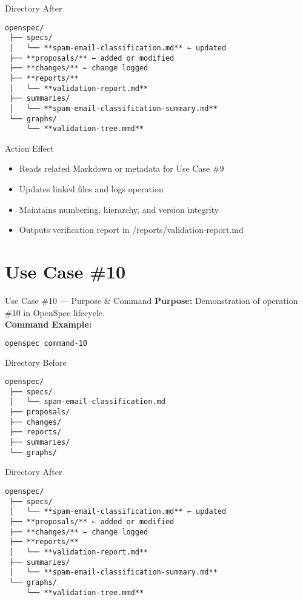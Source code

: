 \documentclass[aspectratio=169]{beamer}
\begin{document}
\begin{frame}{Directory After}
\begin{lstlisting}
openspec/
 ├── specs/
 │   └── **spam-email-classification.md** ← updated
 ├── **proposals/** ← added or modified
 ├── **changes/** ← change logged
 ├── **reports/**
 │   └── **validation-report.md**
 ├── summaries/
 │   └── **spam-email-classification-summary.md**
 └── graphs/
     └── **validation-tree.mmd**
\end{lstlisting}
\end{frame}

\begin{frame}{Action Effect}
\begin{itemize}
  \item Reads related Markdown or metadata for Use Case \#9
  \item Updates linked files and logs operation
  \item Maintains numbering, hierarchy, and version integrity
  \item Outputs verification report in /reports/validation-report.md
\end{itemize}
\end{frame}

\section*{Use Case \#10}
\begin{frame}{Use Case \#10 --- Purpose \& Command}
\textbf{Purpose:} Demonstration of operation \#10 in OpenSpec lifecycle.\\[4pt]
\textbf{Command Example:}
\begin{lstlisting}[language=bash]
openspec command-10
\end{lstlisting}
\end{frame}

\begin{frame}{Directory Before}
\begin{lstlisting}
openspec/
 ├── specs/
 │   └── spam-email-classification.md
 ├── proposals/
 ├── changes/
 ├── reports/
 ├── summaries/
 └── graphs/
\end{lstlisting}
\end{frame}

\begin{frame}{Directory After}
\begin{lstlisting}
openspec/
 ├── specs/
 │   └── **spam-email-classification.md** ← updated
 ├── **proposals/** ← added or modified
 ├── **changes/** ← change logged
 ├── **reports/**
 │   └── **validation-report.md**
 ├── summaries/
 │   └── **spam-email-classification-summary.md**
 └── graphs/
     └── **validation-tree.mmd**
\end{lstlisting}
\end{frame}
\end{document}
